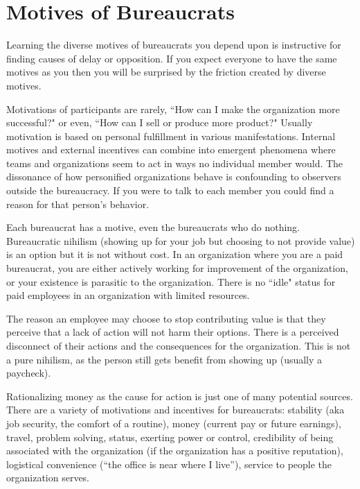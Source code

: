 \section{Motives of Bureaucrats\label{sec:motivations}}

Learning the diverse motives of bureaucrats you depend upon is instructive for finding causes of delay or opposition. If you expect everyone to have the same motives as you then you will be surprised by the friction created by diverse motives. 

Motivations of participants are rarely, ``How can I make the organization more successful?" or even, ``How can I sell or produce more product?" Usually motivation is based on personal fulfillment in various manifestations. Internal motives and external incentives can combine into emergent phenomena where teams and organizations seem to act in ways no individual member would. The dissonance of how personified organizations behave is confounding to observers outside the bureaucracy. If you were to talk to each member you could find a reason for that person's behavior. 



Each bureaucrat has a motive, even the bureaucrats who do nothing. Bureaucratic nihilism (showing up for your job but choosing to not provide value) is an option but it is not without cost.
In an organization where you are a paid bureaucrat, you are either actively working for improvement of the organization, or your existence is parasitic to the organization. There is no ``idle" status for paid employees in an organization with limited resources.

The reason an employee may choose to stop contributing value is that they perceive that a lack of action will not harm their options. There is a perceived disconnect of their actions and the consequences for the organization. This is not a pure nihilism, as the person still gets benefit from showing up (usually a paycheck).

Rationalizing money as the cause for action is just one of many potential sources.
There are a variety of motivations and incentives for bureaucrats: 
stability (aka job security, the comfort of a routine),
money (current pay or future earnings), 
travel, 
problem solving, 
status, 
exerting power or control, 
credibility of being associated with the organization (if the organization has a positive reputation), 
logistical convenience (``the office is near where I live''), 
service to people the organization serves.


